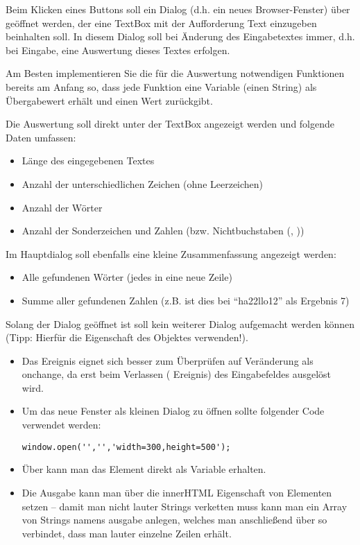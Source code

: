 %
\par Beim Klicken eines Buttons soll ein Dialog (d.h. ein neues
Browser-Fenster) über  geöffnet werden, der eine TextBox mit
der Aufforderung Text einzugeben beinhalten soll. In diesem Dialog soll bei
Änderung des Eingabetextes immer, d.h. bei Eingabe, eine Auswertung dieses
Textes erfolgen.
%
\par Am Besten implementieren Sie die für die Auswertung notwendigen Funktionen
bereits am Anfang so, dass jede Funktion eine Variable (einen String) als
Übergabewert erhält und einen Wert zurückgibt.
%
\par Die Auswertung soll direkt unter der TextBox angezeigt werden und folgende
Daten umfassen:
%
\begin{itemize}
\item
Länge des eingegebenen Textes
\item
Anzahl der unterschiedlichen Zeichen (ohne Leerzeichen)
\item
Anzahl der Wörter
\item
Anzahl der Sonderzeichen und Zahlen (bzw. Nichtbuchstaben (,
))
\end{itemize}
%
\par Im Hauptdialog soll ebenfalls eine kleine Zusammenfassung angezeigt
werden:
%
\begin{itemize}
\item Alle gefundenen Wörter (jedes in eine neue Zeile)
\item Summe aller gefundenen Zahlen (z.B. ist dies bei ``ha22llo12'' als
Ergebnis 7)
\end{itemize}
%
\par Solang der Dialog geöffnet ist soll kein weiterer Dialog aufgemacht werden
können (Tipp: Hierfür die Eigenschaft  des  Objektes
verwenden!).
%
%
\begin{itemize}
\item
Das Ereignis  eignet sich besser zum Überprüfen auf Veränderung
als onchange, da  erst beim Verlassen ( Ereignis)
des Eingabefeldes ausgelöst wird.
\item
Um das neue Fenster als kleinen Dialog zu öffnen sollte folgender Code
verwendet werden:
%
\begin{lstlisting}
window.open('','','width=300,height=500');
\end{lstlisting}
%
\item
Über  kann man das Element direkt als Variable erhalten.
\item
Die Ausgabe kann man über die innerHTML Eigenschaft von Elementen setzen –
damit man nicht lauter Strings verketten muss kann man ein Array von Strings
namens ausgabe anlegen, welches man anschließend über
 so verbindet, dass man lauter einzelne Zeilen
erhält.
\end{itemize}
%